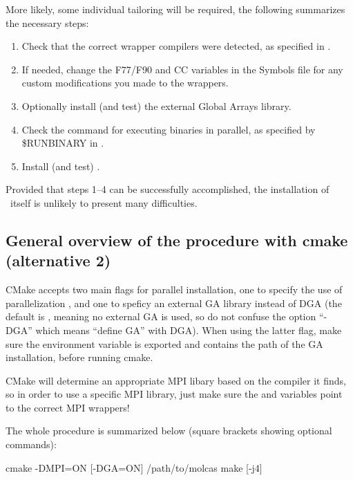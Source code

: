 More likely, some individual tailoring will be required, the following
summarizes the necessary steps:
\begin{enumerate}
\item Check that the correct wrapper compilers were detected, as specified in .
\item If needed, change the F77/F90 and CC variables in the Symbols file for any custom modifications you made to the wrappers.
\item Optionally install (and test) the external Global Arrays library.
\item Check the command for executing binaries in parallel, as specified by \$RUNBINARY in
.
\item Install (and test) \molcas.
\end{enumerate}
Provided that steps 1--4 can be successfully accomplished, the installation
of \molcas\ itself is unlikely to present many difficulties.

\subsection{General overview of the procedure with cmake (alternative 2)}

CMake accepts two main flags for parallel installation, one to specify the
use of parallelization , and one to speficy an external GA
library  instead of DGA (the default is , meaning no
external GA is used, so do not confuse the option ``-DGA'' which means ``define GA''
with DGA). When using the latter  flag, make sure the  environment
variable is exported and contains the path of the GA installation, before running
cmake.

CMake will determine an appropriate MPI libary based on the compiler it finds, so in order
to use a specific MPI library, just make sure the  and 
variables point to the correct MPI wrappers!

The whole procedure is summarized below (square brackets showing optional commands):
\begin{sourcelisting}
    [export GAROOT=/path/to/external/GA]
    [CC=/path/to/mpicc] [FC=/path/to/mpifort] cmake -DMPI=ON [-DGA=ON] /path/to/molcas
    make [-j4]
\end{sourcelisting}

